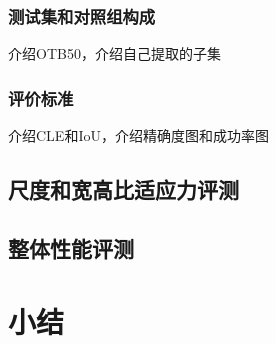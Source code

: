 \subsubsection{测试集和对照组构成}
介绍OTB50，介绍自己提取的子集
\subsubsection{评价标准}
介绍CLE和IoU，介绍精确度图和成功率图
\subsection{尺度和宽高比适应力评测}
\subsection{整体性能评测}

\section{小结}
